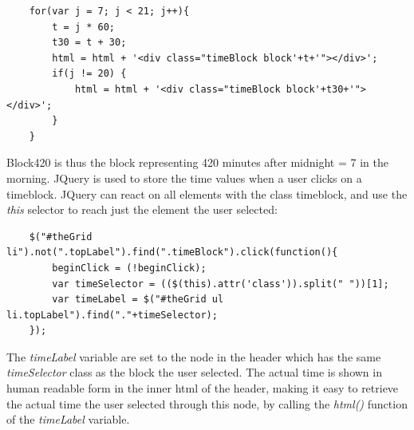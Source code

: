 \begin{verbatim}
    for(var j = 7; j < 21; j++){
        t = j * 60;
        t30 = t + 30;
        html = html + '<div class="timeBlock block'+t+'"></div>';
        if(j != 20) {
            html = html + '<div class="timeBlock block'+t30+'"></div>';	
        }
    }
\end{verbatim}

Block420 is thus the block representing 420 minutes after midnight = 7 in the morning. JQuery is used to store the time values when a user clicks on a timeblock. JQuery can react on all elements with the class timeblock, and use the \emph{this} selector to reach just the element the user selected:

\begin{verbatim}
    $("#theGrid li").not(".topLabel").find(".timeBlock").click(function(){
        beginClick = (!beginClick);
        var timeSelector = (($(this).attr('class')).split(" "))[1];
        var timeLabel = $("#theGrid ul li.topLabel").find("."+timeSelector);
    });
\end{verbatim}

The \emph{timeLabel} variable are set to the node in the header which has the same \emph{timeSelector} class as the block the user selected. The actual time is shown in human readable form in the inner html of the header, making it easy to retrieve the actual time the user selected through this node, by calling the \emph{html()} function of the \emph{timeLabel} variable.
